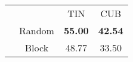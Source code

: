
\begin{center}\vspace{-.2em}
\begin{tabular}{ c c c c }
\multicolumn{2}{c}{} & TIN & CUB \\
\shline
\multirow{2}{*}{Masking} & Random & \textbf{55.00} & \textbf{42.54} \\
& Block & 48.77 & 33.50 
\end{tabular}\vspace{-.2em}
\end{center}